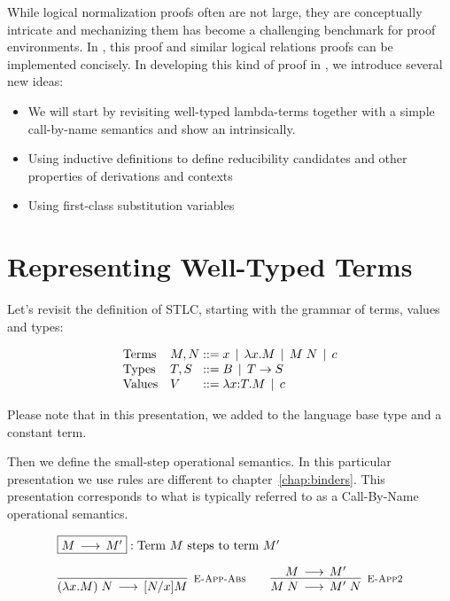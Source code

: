 While logical normalization proofs often are not large, they are
conceptually intricate and mechanizing them has become a challenging
benchmark for proof environments. In \beluga, this proof and similar
logical relations proofs can be implemented concisely. In developing
this kind of proof in \beluga, we introduce several new ideas:

\begin{itemize}
\item We will start by revisiting well-typed lambda-terms together with a
simple call-by-name semantics and show an intrinsically.

\item Using inductive definitions to define reducibility candidates
  and other properties of derivations and contexts

\item Using first-class substitution variables

\end{itemize}





\section{Representing Well-Typed Terms}

Let's revisit the definition of STLC, starting with the grammar of terms, values and types:

\[
\begin{array}{ll@{\bnfas}l}
\mbox{Terms} & M, N & x \bnfalt \lam x.M \bnfalt M \app N \bnfalt c\\
\mbox{Types} & T, S & B \bnfalt T \arrow S\\
\mbox{Values} & V & \lam x{:}T.M \bnfalt c
\end{array}
\]

Please note that in this presentation, we added to the language base
type and a constant term.

Then we define the small-step operational semantics. In this
particular presentation we use rules are different to
chapter~\ref{chap:binders}. This presentation corresponds to what is
typically referred to as a Call-By-Name operational semantics.

\[
\begin{array}{c}
\multicolumn{1}{l}{\fbox{$M \Steps M'$}: \mbox{Term $M$ steps to term $M'$}}
\\[1em]
\infer[\EAppBeta]{(\lam x.M) \app N \Steps [N/x]M}{} \qquad
\infer[\EAppArgStep]{M \app N \Steps M'\;N}{M \Steps M'} \\[1em]
\end{array}
\]

